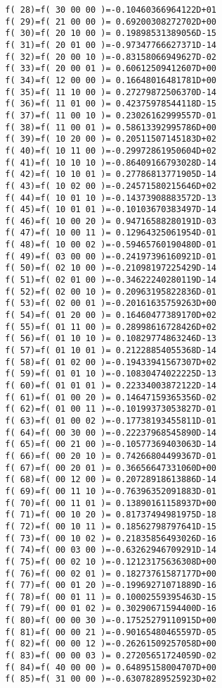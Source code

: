 {\begin{verbatim}
  f( 28)=f( 30 00 00 )=-0.10460366964122D+01
  f( 29)=f( 21 00 00 )= 0.69200308272702D+00
  f( 30)=f( 20 10 00 )= 0.19898531389056D-15
  f( 31)=f( 20 01 00 )=-0.97347766627371D-14
  f( 32)=f( 20 00 10 )=-0.83158066949627D-02
  f( 33)=f( 20 00 01 )= 0.60612509412607D+00
  f( 34)=f( 12 00 00 )= 0.16648016481781D+00
  f( 35)=f( 11 10 00 )= 0.27279872506370D-14
  f( 36)=f( 11 01 00 )= 0.42375978544118D-15
  f( 37)=f( 11 00 10 )= 0.23026162999557D-01
  f( 38)=f( 11 00 01 )= 0.58613392995786D+00
  f( 39)=f( 10 20 00 )= 0.20511507145183D+02
  f( 40)=f( 10 11 00 )=-0.29972861950604D+02
  f( 41)=f( 10 10 10 )=-0.86409166793028D-14
  f( 42)=f( 10 10 01 )= 0.27786813771905D-14
  f( 43)=f( 10 02 00 )=-0.24571580215646D+02
  f( 44)=f( 10 01 10 )=-0.14373908883572D-13
  f( 45)=f( 10 01 01 )=-0.10103670383497D-14
  f( 46)=f( 10 00 20 )= 0.94716588280191D-03
  f( 47)=f( 10 00 11 )= 0.12964325061954D-01
  f( 48)=f( 10 00 02 )=-0.59465760190480D-01
  f( 49)=f( 03 00 00 )=-0.24197396160921D-01
  f( 50)=f( 02 10 00 )=-0.21098197225429D-14
  f( 51)=f( 02 01 00 )=-0.34622240280119D-14
  f( 52)=f( 02 00 10 )= 0.20963195822836D-01
  f( 53)=f( 02 00 01 )=-0.20161635759263D+00
  f( 54)=f( 01 20 00 )= 0.16460477389170D+02
  f( 55)=f( 01 11 00 )= 0.28998616728426D+02
  f( 56)=f( 01 10 10 )= 0.10829774863246D-13
  f( 57)=f( 01 10 01 )= 0.21228854055368D-14
  f( 58)=f( 01 02 00 )=-0.19433941567307D+02
  f( 59)=f( 01 01 10 )=-0.10830474022225D-13
  f( 60)=f( 01 01 01 )= 0.22334003872122D-14
  f( 61)=f( 01 00 20 )= 0.14647159365356D-02
  f( 62)=f( 01 00 11 )=-0.10199373053827D-01
  f( 63)=f( 01 00 02 )=-0.17738193455811D-01
  f( 64)=f( 00 30 00 )=-0.22237968545890D-14
  f( 65)=f( 00 21 00 )=-0.10577369403063D-14
  f( 66)=f( 00 20 10 )= 0.74266804499367D-01
  f( 67)=f( 00 20 01 )= 0.36656647331060D+00
  f( 68)=f( 00 12 00 )= 0.20728918613886D-14
  f( 69)=f( 00 11 10 )=-0.76396352091883D-01
  f( 70)=f( 00 11 01 )= 0.13890161158937D+00
  f( 71)=f( 00 10 20 )= 0.81737494981975D-18
  f( 72)=f( 00 10 11 )= 0.18562798797641D-15
  f( 73)=f( 00 10 02 )= 0.21835856493026D-16
  f( 74)=f( 00 03 00 )=-0.63262946709291D-14
  f( 75)=f( 00 02 10 )=-0.12123175636308D+00
  f( 76)=f( 00 02 01 )= 0.18273761587177D+00
  f( 77)=f( 00 01 20 )=-0.19969271071889D-16
  f( 78)=f( 00 01 11 )= 0.10002559395463D-15
  f( 79)=f( 00 01 02 )= 0.30290671594400D-16
  f( 80)=f( 00 00 30 )=-0.17525279110915D+00
  f( 81)=f( 00 00 21 )=-0.90165480465597D-05
  f( 82)=f( 00 00 12 )=-0.26261509257058D+00
  f( 83)=f( 00 00 03 )= 0.27205651724059D-02
  f( 84)=f( 40 00 00 )= 0.64895158004707D+00
  f( 85)=f( 31 00 00 )=-0.63078289525923D+02

\end{verbatim}}
